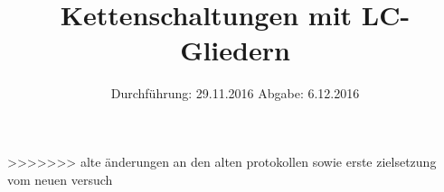 


\subject{V354}
\title{Kettenschaltungen mit LC-Gliedern}
\date{
	Durchführung: 29.11.2016
	\hspace{4em}
	Abgabe: 6.12.2016
}


	\maketitle
	\newpage
	\tableofcontents
	\newpage
	
	
	
	
	
	\newpage
	
	\printbibliography

>>>>>>> alte änderungen an den alten protokollen sowie erste zielsetzung vom neuen versuch
